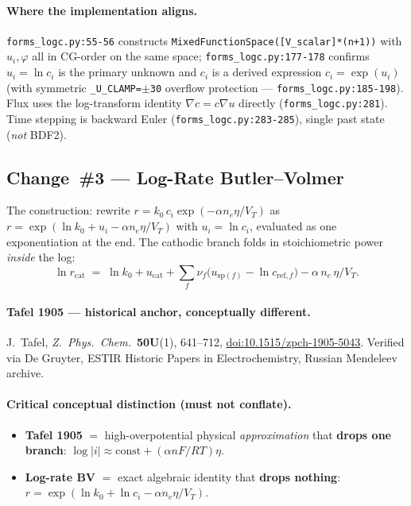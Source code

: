 \documentclass[11pt]{article}
\newcommand{\VT}{V_{T}}
\begin{document}
\paragraph{Where the implementation aligns.}
\texttt{forms\_logc.py:55-56} constructs
\texttt{MixedFunctionSpace([V\_scalar]*(n+1))} with $u_i,\varphi$ all in
CG-order on the same space; \texttt{forms\_logc.py:177-178} confirms
$u_i=\ln c_i$ is the primary unknown and $c_i$ is a derived expression
$c_i=\exp(u_i)$ (with symmetric \texttt{\_U\_CLAMP=$\pm$30} overflow
protection --- \texttt{forms\_logc.py:185-198}). Flux uses the log-transform
identity $\nabla c=c\nabla u$ directly (\texttt{forms\_logc.py:281}). Time
stepping is backward Euler (\texttt{forms\_logc.py:283-285}), single past
state (\emph{not} BDF2).

\subsection{Change~\#3 --- Log-Rate Butler--Volmer}

The construction: rewrite
$r=k_0\,c_i\exp(-\alpha n_e\eta/\VT)$
as
$r=\exp(\ln k_0+u_i-\alpha n_e\eta/\VT)$ with $u_i=\ln c_i$, evaluated as one
exponentiation at the end. The cathodic branch folds in stoichiometric power
\emph{inside} the log:
\[
\ln r_{\mathrm{cat}}
\;=\; \ln k_0 + u_{\mathrm{cat}}
       + \sum_f \nu_f\bigl(u_{\mathrm{sp}(f)} - \ln c_{\mathrm{ref},f}\bigr)
       - \alpha\, n_e\,\eta/\VT.
\]

\paragraph{Tafel 1905 --- historical anchor, conceptually different.}
J.~Tafel, \emph{Z.~Phys.~Chem.}\ \textbf{50U}(1), 641--712,
\href{https://doi.org/10.1515/zpch-1905-5043}{doi:10.1515/zpch-1905-5043}.
Verified via De Gruyter, ESTIR Historic Papers in Electrochemistry, Russian
Mendeleev archive.

\paragraph{Critical conceptual distinction (must not conflate).}
\begin{itemize}
\item \textbf{Tafel 1905} $=$ high-overpotential physical \emph{approximation}
      that \textbf{drops one branch}: $\log|i|\approx \mathrm{const} + (\alpha
      nF/RT)\eta$.
\item \textbf{Log-rate BV} $=$ exact algebraic identity that \textbf{drops
      nothing}: $r=\exp(\ln k_0 + \ln c_i - \alpha n_e\eta/\VT)$.
\end{itemize}
\end{document}
